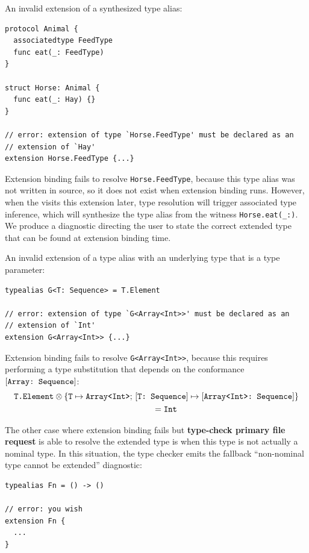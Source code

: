 \documentclass[../generics]{subfiles}
\begin{document}
\begin{example}\label{bad extension 1} An invalid extension of a synthesized type alias:
\begin{Verbatim}
protocol Animal {
  associatedtype FeedType
  func eat(_: FeedType)
}

struct Horse: Animal {
  func eat(_: Hay) {}
}

// error: extension of type `Horse.FeedType' must be declared as an
// extension of `Hay'
extension Horse.FeedType {...}
\end{Verbatim}
Extension binding fails to resolve \texttt{Horse.FeedType}, because this type alias was not written in source, so it does not exist when extension binding runs. However, when the  visits this extension later, type resolution will trigger associated type inference, which will synthesize the type alias from the witness \verb|Horse.eat(_:)|. We produce a diagnostic directing the user to state the correct extended type that can be found at extension binding time.
\end{example}
\begin{example}\label{bad extension 2}
An invalid extension of a type alias with an underlying type that is a type parameter:
\begin{Verbatim}
typealias G<T: Sequence> = T.Element

// error: extension of type `G<Array<Int>>' must be declared as an
// extension of `Int'
extension G<Array<Int>> {...}
\end{Verbatim}
Extension binding fails to resolve \texttt{G<Array<Int>>}, because this requires performing a type substitution that depends on the conformance $[\texttt{Array:~Sequence}]$:
\begin{gather*}
\texttt{T.Element}\otimes\{\texttt{T} \mapsto \texttt{Array<Int>};\,[\texttt{T:~Sequence}] \mapsto [\texttt{Array<Int>:~Sequence}]\}\\
\qquad {} =\texttt{Int}
\end{gather*}
\end{example}

The other case where extension binding fails but \textbf{type-check primary file request} is able to resolve the extended type is when this type is not actually a nominal type. In this situation, the type checker emits the fallback ``non-nominal type cannot be extended'' diagnostic:
\begin{Verbatim}
typealias Fn = () -> ()

// error: you wish
extension Fn {
  ...
}
\end{Verbatim}
\end{document}
